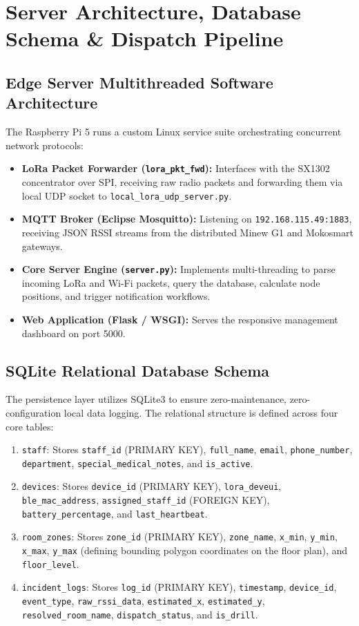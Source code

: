 \section{Server Architecture, Database Schema \& Dispatch Pipeline}

\subsection{Edge Server Multithreaded Software Architecture}
The Raspberry Pi 5 runs a custom Linux service suite orchestrating concurrent network protocols:
\begin{itemize}
    \item \textbf{LoRa Packet Forwarder (\texttt{lora\_pkt\_fwd}):} Interfaces with the SX1302 concentrator over SPI, receiving raw radio packets and forwarding them via local UDP socket to \texttt{local\_lora\_udp\_server.py}.
    \item \textbf{MQTT Broker (Eclipse Mosquitto):} Listening on \texttt{192.168.115.49:1883}, receiving JSON RSSI streams from the distributed Minew G1 and Mokosmart gateways.
    \item \textbf{Core Server Engine (\texttt{server.py}):} Implements multi-threading to parse incoming LoRa and Wi-Fi packets, query the database, calculate node positions, and trigger notification workflows.
    \item \textbf{Web Application (Flask / WSGI):} Serves the responsive management dashboard on port 5000.
\end{itemize}

\subsection{SQLite Relational Database Schema}
The persistence layer utilizes SQLite3 to ensure zero-maintenance, zero-configuration local data logging. The relational structure is defined across four core tables:
\begin{enumerate}
    \item \texttt{staff}: Stores \texttt{staff\_id} (PRIMARY KEY), \texttt{full\_name}, \texttt{email}, \texttt{phone\_number}, \texttt{department}, \texttt{special\_medical\_notes}, and \texttt{is\_active}.
    \item \texttt{devices}: Stores \texttt{device\_id} (PRIMARY KEY), \texttt{lora\_deveui}, \texttt{ble\_mac\_address}, \texttt{assigned\_staff\_id} (FOREIGN KEY), \texttt{battery\_percentage}, and \texttt{last\_heartbeat}.
    \item \texttt{room\_zones}: Stores \texttt{zone\_id} (PRIMARY KEY), \texttt{zone\_name}, \texttt{x\_min}, \texttt{y\_min}, \texttt{x\_max}, \texttt{y\_max} (defining bounding polygon coordinates on the floor plan), and \texttt{floor\_level}.
    \item \texttt{incident\_logs}: Stores \texttt{log\_id} (PRIMARY KEY), \texttt{timestamp}, \texttt{device\_id}, \texttt{event\_type}, \texttt{raw\_rssi\_data}, \texttt{estimated\_x}, \texttt{estimated\_y}, \texttt{resolved\_room\_name}, \texttt{dispatch\_status}, and \texttt{is\_drill}.
\end{enumerate}

